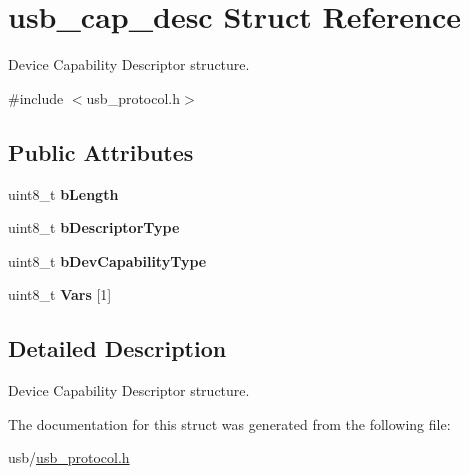 \hypertarget{structusb__cap__desc}{}\section{usb\+\_\+cap\+\_\+desc Struct Reference}
\label{structusb__cap__desc}


Device Capability Descriptor structure.  




{\ttfamily \#include $<$usb\+\_\+protocol.\+h$>$}

\subsection*{Public Attributes}
\begin{DoxyCompactItemize}
\item 
\mbox{\label{structusb__cap__desc_ac442eb939c68db3253910cd76c4e2d22}} 
uint8\+\_\+t {\bfseries b\+Length}
\item 
\mbox{\label{structusb__cap__desc_abb7839cb9f059099525940a5f574fd8a}} 
uint8\+\_\+t {\bfseries b\+Descriptor\+Type}
\item 
\mbox{\label{structusb__cap__desc_abd3a1126cb1671db9ba8e6c41280d077}} 
uint8\+\_\+t {\bfseries b\+Dev\+Capability\+Type}
\item 
\mbox{\label{structusb__cap__desc_a5e70ea8fc21897643e26dd1538c20ae9}} 
uint8\+\_\+t {\bfseries Vars} \mbox{[}1\mbox{]}
\end{DoxyCompactItemize}


\subsection{Detailed Description}
Device Capability Descriptor structure. 

The documentation for this struct was generated from the following file\+:\begin{DoxyCompactItemize}
\item 
usb/\hyperlink{usb__protocol_8h}{usb\+\_\+protocol.\+h}\end{DoxyCompactItemize}

